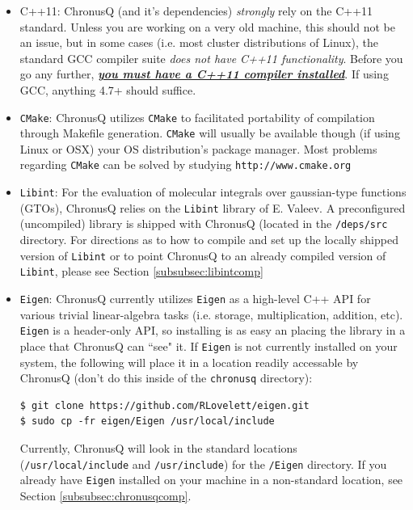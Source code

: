 \documentclass[12pt]{article}
\begin{document}
\begin{itemize}
\item C++11: ChronusQ (and it's dependencies) \emph{strongly} rely on the C++11 standard. Unless you are working on a very old machine, this should not be an issue, but in some cases (i.e. most cluster distributions of Linux), the standard GCC compiler suite \emph{does not have C++11 functionality}. Before you go any further, \emph{\textbf{\underline{you must have a C++11 compiler installed}}}. If using GCC, anything 4.7+ should suffice.

\item \texttt{CMake}: ChronusQ utilizes \texttt{CMake} to facilitated portability of compilation through Makefile generation. \texttt{CMake} will usually be available though (if using Linux or OSX) your OS distribution's package manager. Most problems regarding \texttt{CMake} can be solved by studying \texttt{http://www.cmake.org}

\item \texttt{Libint}: For the evaluation of molecular integrals over gaussian-type functions (GTOs), ChronusQ relies on the \texttt{Libint} library of E. Valeev. A preconfigured (uncompiled) library is shipped with ChronusQ (located in the \texttt{/deps/src} directory. For directions as to how to compile and set up the locally shipped version of \texttt{Libint} or to point ChronusQ to an already compiled version of \texttt{Libint}, please see Section \ref{subsubsec:libintcomp}

\item \texttt{Eigen}: ChronusQ currently utilizes \texttt{Eigen} as a high-level C++ API for various trivial linear-algebra tasks (i.e. storage, multiplication, addition, etc). \texttt{Eigen} is a header-only API, so installing is as easy an placing the library in a place that ChronusQ can ``see" it. If \texttt{Eigen} is not currently installed on your system, the following will place it in a location readily accessable by ChronusQ (don't do this inside of the \texttt{chronusq} directory):
\begin{lstlisting}
$ git clone https://github.com/RLovelett/eigen.git
$ sudo cp -fr eigen/Eigen /usr/local/include
\end{lstlisting}
Currently, ChronusQ will look in the standard locations (\texttt{/usr/local/include} and \texttt{/usr/include}) for the \texttt{/Eigen} directory. If you already have \texttt{Eigen} installed on your machine in a non-standard location, see Section \ref{subsubsec:chronusqcomp}.


\end{itemize}
\end{document}
